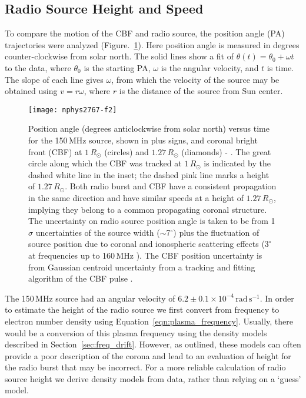 \subsection{Radio Source Height and Speed}
To compare the motion of the CBF and radio source, the position angle (PA) trajectories were analyzed (Figure.~\ref{fig:angle_time}). Here position angle is measured in degrees counter-clockwise from solar north. The solid lines show a fit of $\theta(t) = \theta_0 + \omega t$ to the data, where $\theta_0$ is the starting PA, $\omega$ is the angular velocity, and $t$ is time. The slope of each line gives $\omega$, from which the velocity of the source may be obtained using $v=r\omega$, where $r$ is the distance of the source from Sun center. 
\begin{figure}[!t]
\begin{center}
\texttt{[image: nphys2767-f2]}
\caption[Radio source and CBF position angle versus time]{Position angle (degrees anticlockwise from solar north) versus time for the 150\,MHz source, shown in plus signs, and coronal bright front (CBF) at $1\,R_{\odot}$ (circles) and $1.27\,R_{\odot}$ (diamonds) - \citep{carley2013}. The great circle along which the CBF was tracked at $1\,R_{\odot}$ is indicated by the dashed white line in the inset; the dashed pink line marks a height of $1.27\,R_{\odot}$. Both radio burst and CBF have a consistent propagation in the same direction and have similar speeds at a height of $1.27\,R_{\odot}$, implying they belong to a common propagating coronal structure. The uncertainty on radio source position angle is taken to be from 1$\sigma$ uncertainties of the source width ($\sim$7$^{\circ}$) plus the fluctuation of source position due to coronal and ionospheric scattering effects ($3^{\circ}$ at frequencies up to 160\,MHz \citep{stewart1982}). The CBF position uncertainty is from Gaussian centroid uncertainty from a tracking and fitting algorithm of the CBF pulse \citep{long2011a}.}
\label{fig:angle_time}
\end{center}
\end{figure}

The 150\,MHz source had an angular velocity of $6.2\pm0.1\times10^{-4}\,\mathrm{rad\,s^{-1}} $. In order to estimate the height of the radio source we first convert from frequency to electron number density using Equation~\ref{eqn:plasma_frequency}. Usually, there would be a conversion of this plasma frequency using the density models described in Section~\ref{sec:freq_drift}. However, as outlined, these models can often provide a poor description of the corona and lead to an evaluation of height for the radio burst that may be incorrect. For a more reliable calculation of radio source height we derive density models from data, rather than relying on a `guess' model.

